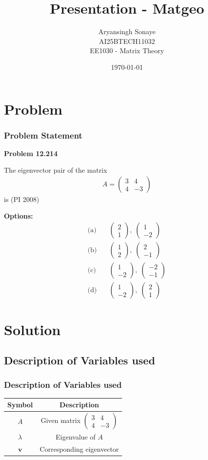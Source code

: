 \documentclass{beamer}
\title{Presentation - Matgeo}
\author{Aryansingh Sonaye \\
AI25BTECH11032 \\
EE1030 - Matrix Theory}
\date{\today}
\theoremstyle{remark}
\newcommand{\myvec}[1]{\ensuremath{\begin{pmatrix}#1\end{pmatrix}}}
\let\vec\mathbf
\numberwithin{equation}{section}
\begin{document}
\begin{frame}
\titlepage
\end{frame}

\section{Problem}
\begin{frame}
\frametitle{Problem Statement}
\textbf{Problem 12.214} 

The eigenvector pair of the matrix
\begin{align}
A = \myvec{3 & 4 \\ 4 & -3}
\end{align}
is (PI 2008)

\textbf{Options:}
\begin{align}
\text{(a)} \quad & \myvec{2 \\ 1}, \; \myvec{1 \\ -2} \\
\text{(b)} \quad & \myvec{1 \\ 2}, \; \myvec{2 \\ -1} \\
\text{(c)} \quad & \myvec{1 \\ -2}, \; \myvec{-2 \\ -1} \\
\text{(d)} \quad & \myvec{1 \\ -2}, \; \myvec{2 \\ 1}
\end{align}


\end{frame}

\section{Solution}
\subsection{Description of Variables used}
\begin{frame}
\frametitle{Description of Variables used}
\begin{table}[H]
\centering
\begin{tabular}{|c|c|}
\hline
Symbol & Description \\
\hline
$A$ & Given matrix $\myvec{3 & 4 \\ 4 & -3}$ \\
$\lambda$ & Eigenvalue of $A$ \\
$\vec{v}$ & Corresponding eigenvector \\
\hline
\end{tabular}
\end{table}


\end{frame}
\end{document}
